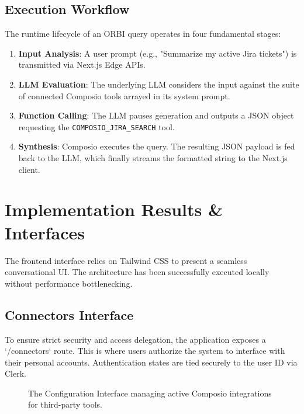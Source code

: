 \documentclass[12pt,a4paper]{article}
\begin{document}
\subsection{Execution Workflow}
The runtime lifecycle of an ORBI query operates in four fundamental stages:
\begin{enumerate}
    \item \textbf{Input Analysis}: A user prompt (e.g., "Summarize my active Jira tickets") is transmitted via Next.js Edge APIs.
    \item \textbf{LLM Evaluation}: The underlying LLM considers the input against the suite of connected Composio tools arrayed in its system prompt.
    \item \textbf{Function Calling}: The LLM pauses generation and outputs a JSON object requesting the \texttt{COMPOSIO\_JIRA\_SEARCH} tool. 
    \item \textbf{Synthesis}: Composio executes the query. The resulting JSON payload is fed back to the LLM, which finally streams the formatted string to the Next.js client.
\end{enumerate}

\section{Implementation Results \& Interfaces}
\label{sec:results}

The frontend interface relies on Tailwind CSS to present a seamless conversational UI. The architecture has been successfully executed locally without performance bottlenecking. 

\subsection{Connectors Interface}
To ensure strict security and access delegation, the application exposes a `/connectors` route. This is where users authorize the system to interface with their personal accounts. Authentication states are tied securely to the user ID via Clerk.

\begin{figure}[H]
    \centering
    \vspace{6cm} %
    \caption{The Configuration Interface managing active Composio integrations for third-party tools.}
    \label{fig:connectors}
\end{figure}
\end{document}
